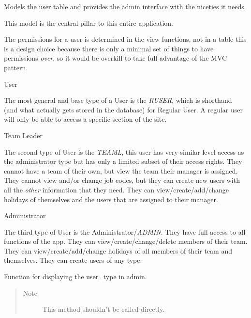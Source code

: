 \documentclass[letterpaper,10pt,english]{sphinxmanual}
\begin{document}
\begin{fulllineitems}
\label{code:timetracker.tracker.models.Tbluser}
Models the user table and provides the admin interface with the
niceties it needs.

This model is the central pillar to this entire application.

The permissions for a user is determined in the view functions, not in a
table this is a design choice because there is only a minimal set of
things to have permissions \emph{over}, so it would be overkill to take full
advantage of the MVC pattern.

User

The most general and base type of a User is the \emph{RUSER}, which is
shorthand (and what actually gets stored in the database) for Regular
User. A regular user will only be able to access a specific section of the
site.

Team Leader

The second type of User is the \emph{TEAML}, this user has very similar level
access as the administrator type but has only a limited subset of their
access rights. They cannot have a team of their own, but view the team
their manager is assigned. They cannot view and/or change job codes, but
they can create new users with all the \emph{other} information that they
need. They can view/create/add/change holidays of themselves and the users
that are assigned to their manager.

Administrator

The third type of User is the Administrator/\emph{ADMIN}. They have full access to all
functions of the app. They can view/create/change/delete members of their
team. They can view/create/add/change holidays of all members of their
team and themselves. They can create users of any type.

\begin{fulllineitems}
\label{code:timetracker.tracker.models.Tbluser.display_user_type}
Function for displaying the user\_type in admin.
\begin{quote}\begin{description}
\item[{Note }] \leavevmode
This method shouldn't be called directly.


\end{description}
\end{quote}
\end{fulllineitems}
\end{fulllineitems}
\end{document}
